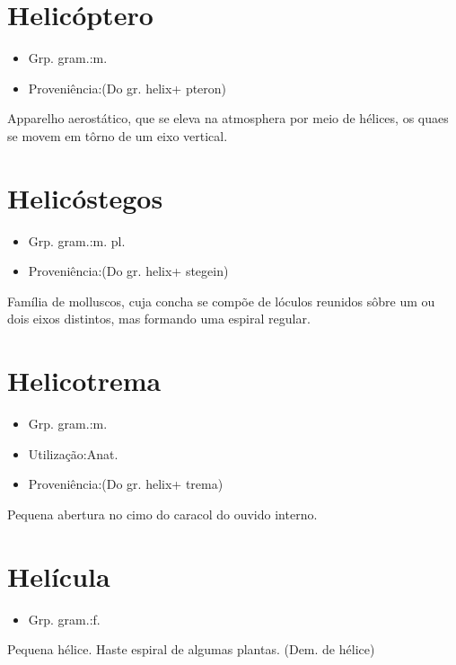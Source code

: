 \documentclass{article}
\begin{document}
\section{Helicóptero}
\begin{itemize}
\item {Grp. gram.:m.}
\end{itemize}
\begin{itemize}
\item {Proveniência:(Do gr. \textunderscore helix\textunderscore  + \textunderscore pteron\textunderscore )}
\end{itemize}
Apparelho aerostático, que se eleva na atmosphera por meio de hélices, os quaes se movem em tôrno de um eixo vertical.
\section{Helicóstegos}
\begin{itemize}
\item {Grp. gram.:m. pl.}
\end{itemize}
\begin{itemize}
\item {Proveniência:(Do gr. \textunderscore helix\textunderscore  + \textunderscore stegein\textunderscore )}
\end{itemize}
Família de molluscos, cuja concha se compõe de lóculos reunidos sôbre um ou dois eixos distintos, mas formando uma espiral regular.
\section{Helicotrema}
\begin{itemize}
\item {Grp. gram.:m.}
\end{itemize}
\begin{itemize}
\item {Utilização:Anat.}
\end{itemize}
\begin{itemize}
\item {Proveniência:(Do gr. \textunderscore helix\textunderscore  + \textunderscore trema\textunderscore )}
\end{itemize}
Pequena abertura no cimo do caracol do ouvido interno.
\section{Helícula}
\begin{itemize}
\item {Grp. gram.:f.}
\end{itemize}
Pequena hélice.
Haste espiral de algumas plantas.
(Dem. de \textunderscore hélice\textunderscore )
\end{document}
